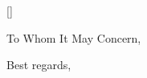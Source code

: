 \documentclass[english]{kthletter}
\date{Stockholm, \today}
\begin{document}
\begin{letter}[]%
  {}
\opening{To Whom It May Concern,}

\closing{Best regards,}



\end{letter}
\end{document}
